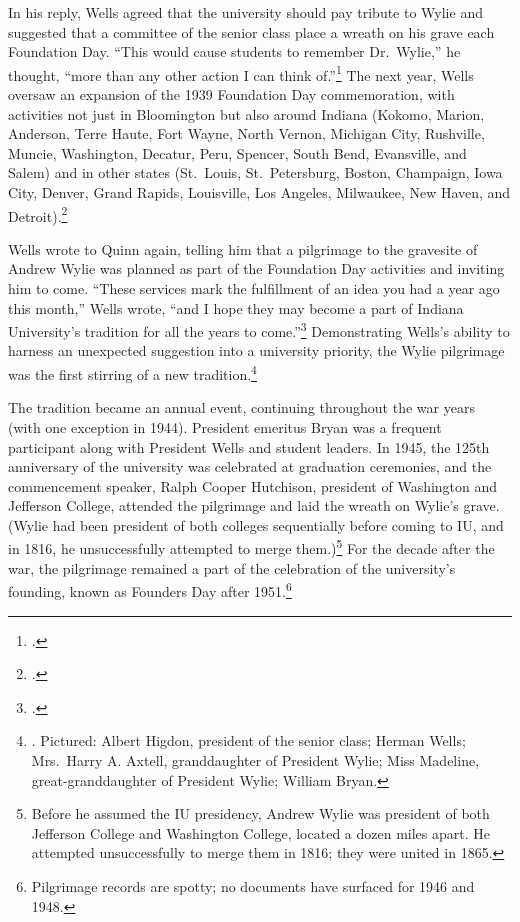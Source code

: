 \documentclass[
  american,
  letterpaper,
]{scrreprt}
\begin{document}
In his reply, Wells agreed that the university should pay tribute to
Wylie and suggested that a committee of the senior class place a wreath
on his grave each Foundation Day. ``This would cause students to
remember Dr.~Wylie,'' he thought, ``more than any other action I can
think of.''\footnote{.} The next year, Wells oversaw an expansion of the 1939
Foundation Day commemoration, with activities not just in Bloomington
but also around Indiana (Kokomo, Marion, Anderson, Terre Haute, Fort
Wayne, North Vernon, Michigan City, Rushville, Muncie, Washington,
Decatur, Peru, Spencer, South Bend, Evansville, and Salem) and in other
states (St.~Louis, St.~Petersburg, Boston, Champaign, Iowa City, Denver,
Grand Rapids, Louisville, Los Angeles, Milwaukee, New Haven, and
Detroit).\footnote{.}

Wells wrote to Quinn again, telling him that a pilgrimage to the
gravesite of Andrew Wylie was planned as part of the Foundation Day
activities and inviting him to come. ``These services mark the
fulfillment of an idea you had a year ago this month,'' Wells wrote,
``and I hope they may become a part of Indiana University's tradition
for all the years to come.''\footnote{.}
Demonstrating Wells's ability to harness an unexpected suggestion into a
university priority, the Wylie pilgrimage was the first stirring of a
new tradition.\footnote{. Pictured: Albert Higdon, president of
  the senior class; Herman Wells; Mrs.~Harry A. Axtell, granddaughter of
  President Wylie; Miss Madeline, great-granddaughter of President
  Wylie; William Bryan.}

The tradition became an annual event, continuing throughout the war
years (with one exception in 1944). President emeritus Bryan was a
frequent participant along with President Wells and student leaders. In
1945, the 125th anniversary of the university was celebrated at
graduation ceremonies, and the commencement speaker, Ralph Cooper
Hutchison, president of Washington and Jefferson College, attended the
pilgrimage and laid the wreath on Wylie's grave. (Wylie had been
president of both colleges sequentially before coming to IU, and in
1816, he unsuccessfully attempted to merge them.)\footnote{Before he
  assumed the IU presidency, Andrew Wylie was president of both
  Jefferson College and Washington College, located a dozen miles apart.
  He attempted unsuccessfully to merge them in 1816; they were united in
  1865.} For the decade after the war, the pilgrimage remained a part of
the celebration of the university's founding, known as Founders Day
after 1951.\footnote{Pilgrimage records are spotty; no documents have
  surfaced for 1946 and 1948.}
\end{document}
